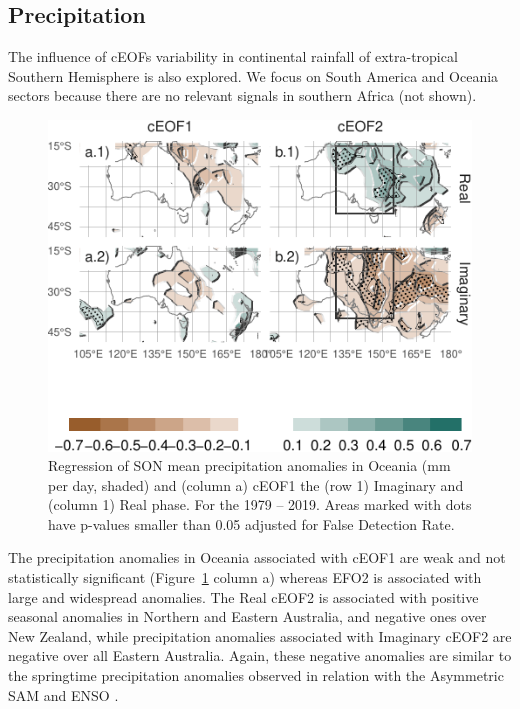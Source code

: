 \documentclass[smallextended]{svjour3}       %
\begin{document}
\hypertarget{precipitation}{%
\subsection{Precipitation}\label{precipitation}}

The influence of cEOFs variability in continental rainfall of extra-tropical Southern Hemisphere is also explored.
We focus on South America and Oceania sectors because there are no relevant signals in southern Africa (not shown).




\begin{figure}
\centering
\includegraphics{../figures/pp-oceania-1.pdf}
\caption{\label{fig:pp-oceania}Regression of SON mean precipitation anomalies in Oceania (mm per day, shaded) and (column a) cEOF1 the (row 1) Imaginary and (column 1) Real phase. For the 1979 -- 2019.
Areas marked with dots have p-values smaller than 0.05 adjusted for False Detection Rate.}
\end{figure}

The precipitation anomalies in Oceania associated with cEOF1 are weak and not statistically significant (Figure~\ref{fig:pp-oceania} column a) whereas EFO2 is associated with large and widespread anomalies. The Real cEOF2 is associated with positive seasonal anomalies in Northern and Eastern Australia, and negative ones over New Zealand, while precipitation anomalies associated with Imaginary cEOF2 are negative over all Eastern Australia. Again, these negative anomalies are similar to the springtime precipitation anomalies observed in relation with the Asymmetric SAM \citep{campitelli2021} and ENSO \citep{cai2011}.
\end{document}
